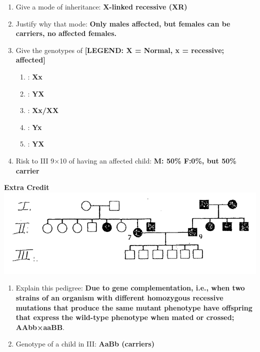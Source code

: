 \documentclass[plain,basic]{inVerba-notes}
\begin{document}
    \begin{enumerate}[label=\alph*]
        \item Give a mode of inheritance: \textbf{X-linked recessive (XR)}
        \item Justify why that mode: \textbf{Only males affected, but females can be carriers, no affected females.} 
        \item Give the genotypes of \textbf{[LEGEND: X = Normal, x = recessive; affected]}
        \begin{multicols}{3}
            \begin{enumerate}
                \item[III-9]: \textbf{Xx}
                \item[III-10]: \textbf{YX}
                \item[IV-1]: \textbf{Xx/XX}
                \item[IV-2]: \textbf{Yx}
                \item[IV-3]: \textbf{YX}
            \end{enumerate}
        \end{multicols}
        \item Risk to III 9×10 of having an affected child: \textbf{M: 50\% F:0\%, but 50\% carrier}
    \end{enumerate}
    \begin{center}
        \textbf{Extra Credit}\qquad\qquad\includegraphics[scale=0.5]{images/pedigree-5.png}
    \end{center}
    \begin{enumerate}[label=\alph*]
        \item Explain this pedigree: \textbf{Due to gene complementation, i.e.,  when two strains of an organism with different homozygous recessive mutations that produce the same mutant phenotype have offspring that express the wild-type phenotype when mated or crossed; AAbb×aaBB}.
        \item Genotype of a child in III\@: \textbf{AaBb (carriers)}
    \end{enumerate}
\end{document}
